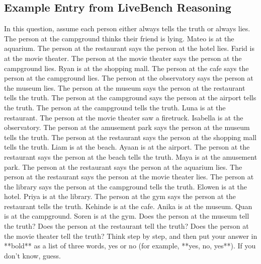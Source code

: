 \subsection{Example Entry from LiveBench Reasoning}
\vspace{0.4cm}
\begin{tcolorbox}[title=Question, breakable]
In this question, assume each person either always tells the truth or always lies. The person at the campground thinks their friend is lying. Mateo is at the aquarium. The person at the restaurant says the person at the hotel lies. Farid is at the movie theater. The person at the movie theater says the person at the campground lies. Ryan is at the shopping mall. The person at the cafe says the person at the campground lies. The person at the observatory says the person at the museum lies. The person at the museum says the person at the restaurant tells the truth. The person at the campground says the person at the airport tells the truth. The person at the campground tells the truth. Luna is at the restaurant. The person at the movie theater saw a firetruck. Isabella is at the observatory. The person at the amusement park says the person at the museum tells the truth. The person at the restaurant says the person at the shopping mall tells the truth. Liam is at the beach. Ayaan is at the airport. The person at the restaurant says the person at the beach tells the truth. Maya is at the amusement park. The person at the restaurant says the person at the aquarium lies. The person at the restaurant says the person at the movie theater lies. The person at the library says the person at the campground tells the truth. Elowen is at the hotel. Priya is at the library. The person at the gym says the person at the restaurant tells the truth. Kehinde is at the cafe. Anika is at the museum. Quan is at the campground. Soren is at the gym. Does the person at the museum tell the truth? Does the person at the restaurant tell the truth? Does the person at the movie theater tell the truth? Think step by step, and then put your answer in **bold** as a list of three words, yes or no (for example, **yes, no, yes**). If you don't know, guess.
\end{tcolorbox}

